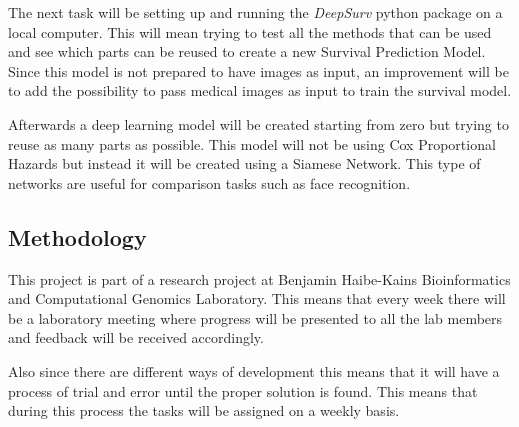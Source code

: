 The next task will be setting up and running the \emph{DeepSurv} python package on a local 
computer. This will mean trying to test all the methods that can be used and see which parts 
can be reused to create a new Survival Prediction Model. Since this model is not prepared
to have images as input, an improvement will be to add the possibility to pass medical 
images as input to train the survival model. 

Afterwards a deep learning model will be created starting from zero but trying to reuse
as many parts as possible. This model will not be using Cox Proportional Hazards but instead
it will be created using a Siamese Network. This type of networks are useful for comparison
tasks such as face recognition. 

\subsection{Methodology}

This project is part of a research project at Benjamin Haibe-Kains Bioinformatics and 
Computational Genomics Laboratory. This means that every week there will be a laboratory meeting
where progress will be presented to all the lab members and feedback will be received accordingly. 

Also since there are different ways of development this means that it will have a process of trial
and error until the proper solution is found. This means that during this process the
tasks will be assigned on a weekly basis.

